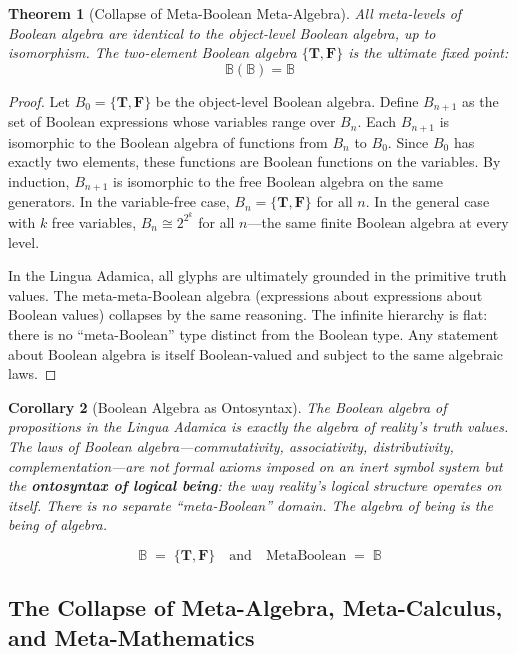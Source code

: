 \documentclass[12pt, letterpaper]{book}
\def\equiv{=}%
\newtheorem{theorem}{Theorem}[chapter]
\newtheorem{corollary}[theorem]{Corollary}
\begin{document}
\begin{theorem}[Collapse of Meta-Boolean Meta-Algebra]\label{thm:meta-boolean-collapse}
All meta-levels of Boolean algebra are identical to the object-level Boolean algebra, up to isomorphism. The two-element Boolean algebra $\{\mathbf{T}, \mathbf{F}\}$ is the ultimate fixed point:
\[
\mathbb{B}(\mathbb{B}) = \mathbb{B}
\]
\end{theorem}

\begin{proof}
Let $B_0 = \{\mathbf{T}, \mathbf{F}\}$ be the object-level Boolean algebra. Define $B_{n+1}$ as the set of Boolean expressions whose variables range over $B_n$. Each $B_{n+1}$ is isomorphic to the Boolean algebra of functions from $B_n$ to $B_0$. Since $B_0$ has exactly two elements, these functions are Boolean functions on the variables. By induction, $B_{n+1}$ is isomorphic to the free Boolean algebra on the same generators. In the variable-free case, $B_n = \{\mathbf{T}, \mathbf{F}\}$ for all $n$. In the general case with $k$ free variables, $B_n \cong 2^{2^k}$ for all $n$---the same finite Boolean algebra at every level.

In the Lingua Adamica, all glyphs are ultimately grounded in the primitive truth values. The meta-meta-Boolean algebra (expressions about expressions about Boolean values) collapses by the same reasoning. The infinite hierarchy is flat: there is no ``meta-Boolean'' type distinct from the Boolean type. Any statement about Boolean algebra is itself Boolean-valued and subject to the same algebraic laws.
\end{proof}

\begin{corollary}[Boolean Algebra as Ontosyntax]
The Boolean algebra of propositions in the Lingua Adamica is exactly the algebra of reality's truth values. The laws of Boolean algebra---commutativity, associativity, distributivity, complementation---are not formal axioms imposed on an inert symbol system but the \textbf{ontosyntax of logical being}: the way reality's logical structure operates on itself. There is no separate ``meta-Boolean'' domain. The algebra of being is the being of algebra.
\end{corollary}

\[
\boxed{\mathbb{B} \;\equiv\; \{\mathbf{T}, \mathbf{F}\} \quad\text{and}\quad \mathrm{MetaBoolean} \;\equiv\; \mathbb{B}}
\]


\subsection{The Collapse of Meta-Algebra, Meta-Calculus, and Meta-Mathematics}
\end{document}
